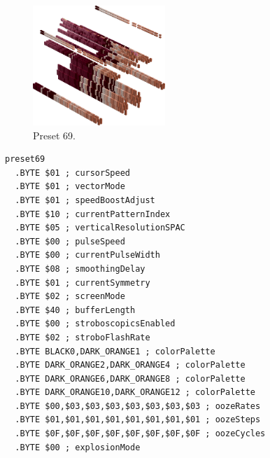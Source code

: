 \clearpage
\begin{minipage}[b]{0.48\linewidth}
\begin{figure}[H]                                                          
  \centering                                                             
  \begin{adjustbox}{width=5cm,center}                                   
  \includegraphics[width=5cm]{src/colorspace_presets/preset69-45.png}%
  \end{adjustbox}                                                        
\caption*{Preset 69.}                                           
\end{figure}                                                               
\end{minipage}
\hspace{0.1cm}
\begin{minipage}[b]{0.48\linewidth}                            
\begin{lstlisting}[basicstyle=\ttfamily\tiny]
preset69
  .BYTE $01 ; cursorSpeed
  .BYTE $01 ; vectorMode
  .BYTE $01 ; speedBoostAdjust
  .BYTE $10 ; currentPatternIndex
  .BYTE $05 ; verticalResolutionSPAC
  .BYTE $00 ; pulseSpeed
  .BYTE $00 ; currentPulseWidth
  .BYTE $08 ; smoothingDelay
  .BYTE $01 ; currentSymmetry
  .BYTE $02 ; screenMode
  .BYTE $40 ; bufferLength
  .BYTE $00 ; stroboscopicsEnabled
  .BYTE $02 ; stroboFlashRate
  .BYTE BLACK0,DARK_ORANGE1 ; colorPalette
  .BYTE DARK_ORANGE2,DARK_ORANGE4 ; colorPalette
  .BYTE DARK_ORANGE6,DARK_ORANGE8 ; colorPalette
  .BYTE DARK_ORANGE10,DARK_ORANGE12 ; colorPalette
  .BYTE $00,$03,$03,$03,$03,$03,$03,$03 ; oozeRates
  .BYTE $01,$01,$01,$01,$01,$01,$01,$01 ; oozeSteps
  .BYTE $0F,$0F,$0F,$0F,$0F,$0F,$0F,$0F ; oozeCycles
  .BYTE $00 ; explosionMode
\end{lstlisting}
\end{minipage}

\vspace*{0.3cm}

